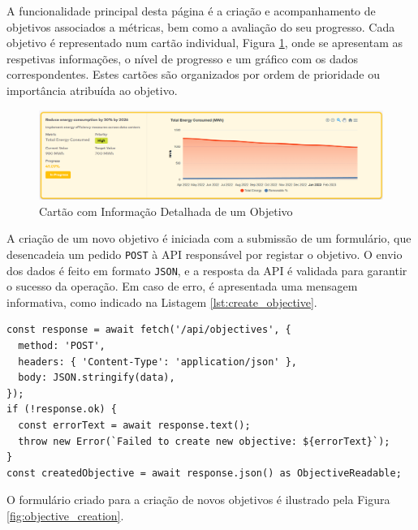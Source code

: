 A funcionalidade principal desta página é a criação e acompanhamento de objetivos associados a métricas, bem como a avaliação do seu progresso. Cada objetivo é representado num cartão individual, Figura \ref{fig:objective_card}, onde se apresentam as respetivas informações, o nível de progresso e um gráfico com os dados correspondentes. Estes cartões são organizados por ordem de prioridade ou importância atribuída ao objetivo.

\begin{figure}[H]
    \centering
    \includegraphics[width=\linewidth,keepaspectratio]{frontmatter/assets/platform_prints/objetives/objective_card.png}
    \caption{Cartão com Informação Detalhada de um Objetivo}
    \label{fig:objective_card}
\end{figure}

A criação de um novo objetivo é iniciada com a submissão de um formulário, que desencadeia um pedido \texttt{POST} à API responsável por registar o objetivo. O envio dos dados é feito em formato \texttt{JSON}, e a resposta da API é validada para garantir o sucesso da operação. Em caso de erro, é apresentada uma mensagem informativa, como indicado na Listagem \ref{lst:create_objective}.

\begin{lstlisting}[style=customts, caption={Pedido \texttt{POST} para criar um novo Objetivo}, label={lst:create_objective}]
const response = await fetch('/api/objectives', {
  method: 'POST',
  headers: { 'Content-Type': 'application/json' },
  body: JSON.stringify(data),
});
if (!response.ok) {
  const errorText = await response.text();
  throw new Error(`Failed to create new objective: ${errorText}`);
}
const createdObjective = await response.json() as ObjectiveReadable;
\end{lstlisting}

O formulário criado para a criação de novos objetivos é ilustrado pela Figura \ref{fig:objective_creation}.

